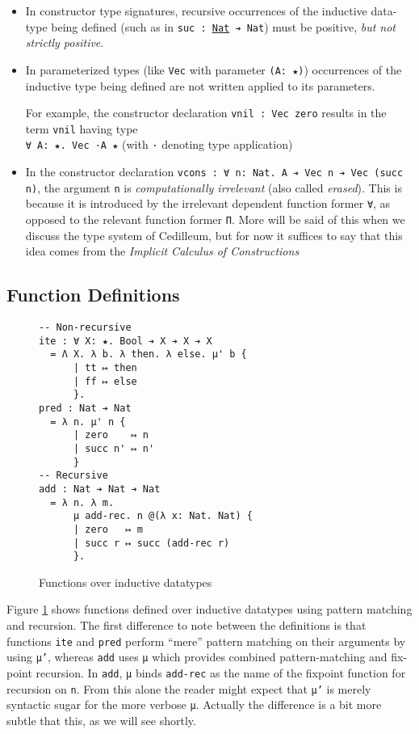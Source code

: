 \documentclass{article}
\begin{document}
\begin{itemize}
\item In constructor type signatures, recursive occurrences of the inductive
  data-type being defined (such as in \texttt{suc : \underline{Nat} ➔ Nat}) must
  be positive, \textit{but not strictly positive}.
\item In parameterized types (like \texttt{Vec} with parameter \texttt{(A: ★)})
  occurrences of the inductive type being defined are not written applied to
  its parameters.
  
  For example, the constructor declaration \texttt{vnil : Vec zero} results in
  the term \texttt{vnil} having type \\ \texttt{∀ A: ★. Vec ·A ★} (with \texttt{·}
  denoting type application)
\item In the constructor declaration \texttt{vcons : ∀ n: Nat. A ➔ Vec n ➔ Vec
    (succ n)}, the argument \texttt{n} is \textit{computationally irrelevant}
  (also called \textit{erased}). This is because it is introduced by the
  irrelevant dependent function former \texttt{∀}, as opposed to the relevant
  function former \texttt{Π}. More will be said of this when we discuss the type
  system of Cedilleum, but for now it suffices to say that this idea comes from
  the \textit{Implicit Calculus of Constructions}\cite{Mi01_ICC}
\end{itemize}

\subsection{Function Definitions}
\begin{figure}[h]
\begin{verbatim}
-- Non-recursive
ite : ∀ X: ★. Bool ➔ X ➔ X ➔ X
  = Λ X. λ b. λ then. λ else. μ' b {
      | tt ↦ then
      | ff ↦ else
      }.
pred : Nat ➔ Nat
  = λ n. μ' n {
      | zero    ↦ n
      | succ n' ↦ n'
      }
-- Recursive
add : Nat ➔ Nat ➔ Nat
  = λ n. λ m.
      μ add-rec. n @(λ x: Nat. Nat) {
      | zero   ↦ m
      | succ r ↦ succ (add-rec r)
      }.
\end{verbatim}
  \caption{Functions over inductive datatypes}
  \label{fig:ex-data-fun}
\end{figure}

Figure \ref{fig:ex-data-fun} shows functions defined over inductive datatypes
using pattern matching and recursion. The first difference to note between the
definitions is that functions \texttt{ite} and \texttt{pred} perform ``mere''
pattern matching on their arguments by using \texttt{μ'}, whereas \texttt{add} uses
\texttt{μ} which provides combined pattern-matching and fix-point recursion. In
\texttt{add}, \texttt{μ} binds \texttt{add-rec} as the name of the fixpoint
function for recursion on \texttt{n}. From this alone the reader might expect
that \texttt{μ'} is merely syntactic sugar for the more verbose \texttt{μ}.
Actually the difference is a bit more subtle that this, as we will see shortly.
\end{document}
